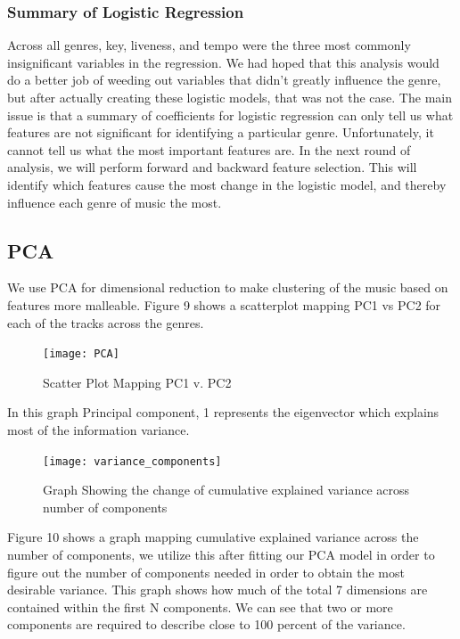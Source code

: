 \documentclass[11pt, a4paper, twocolumn]{article}
\begin{document}
\subsubsection{Summary of Logistic Regression} 
Across all genres, key, liveness, and tempo were the three most commonly insignificant variables in the regression. We had hoped that this analysis would do a better job of weeding out variables that didn't greatly influence the genre, but after actually creating these logistic models, that was not the case.
The main issue is that a summary of coefficients for logistic regression can only tell us what features are not significant for identifying a particular genre. Unfortunately, it cannot tell us what the most important features are. In the next round of analysis, we will perform forward and backward feature selection. This will identify which features cause the most change in the logistic model, and thereby influence each genre of music the most.
\subsection{PCA}
We use PCA for dimensional reduction to make clustering of the music based on features more malleable. Figure 9 shows a scatterplot mapping PC1 vs PC2 for each of the tracks across the genres. 
\begin{figure}[h!]
\texttt{[image: PCA]}
\caption{Scatter Plot Mapping PC1 v. PC2}
\end{figure}

In this graph Principal component, 1 represents the eigenvector which explains most of the information variance.
\begin{figure}[h!]
\texttt{[image: variance\_components]}
\caption{Graph Showing the change of cumulative explained variance across number of components}
\end{figure}

Figure 10 shows a graph mapping cumulative explained variance across the number of components, we utilize this after fitting our PCA model in order to figure out the number of components needed in order to obtain the most desirable variance. This graph shows how much of the total 7 dimensions are contained within the first N components. We can see that two or more components are required to describe close to 100 percent of the variance. 
\end{document}
